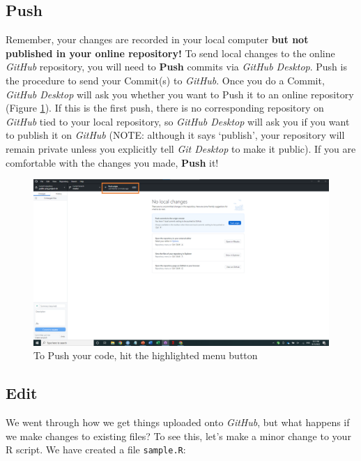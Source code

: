 \documentclass[
]{book}
\begin{document}
\hypertarget{push}{%
\subsection{Push}\label{push}}

Remember, your changes are recorded in your local computer \textbf{but not published in your online repository!} To send local changes to the online \emph{GitHub} repository, you will need to \textbf{Push} commits via \emph{GitHub Desktop}. Push is the procedure to send your Commit(s) to \emph{GitHub}. Once you do a Commit, \emph{GitHub Desktop} will ask you whether you want to Push it to an online repository (Figure \ref{fig:gitdesktop4}). If this is the first push, there is no corresponding repository on \emph{GitHub} tied to your local repository, so \emph{GitHub Desktop} will ask you if you want to publish it on \emph{GitHub} (NOTE: although it says `publish', your repository will remain private unless you explicitly tell \emph{Git Desktop} to make it public). If you are comfortable with the changes you made, \textbf{Push} it!

\begin{figure}

{\centering \includegraphics[width=61.11in]{image/git_image05} 

}

\caption{To Push your code, hit the highlighted menu button}\label{fig:gitdesktop4}
\end{figure}

\hypertarget{edit}{%
\subsection{Edit}\label{edit}}

We went through how we get things uploaded onto \emph{GitHub}, but what happens if we make changes to existing files? To see this, let's make a minor change to your R script. We have created a file \texttt{sample.R}:
\end{document}
